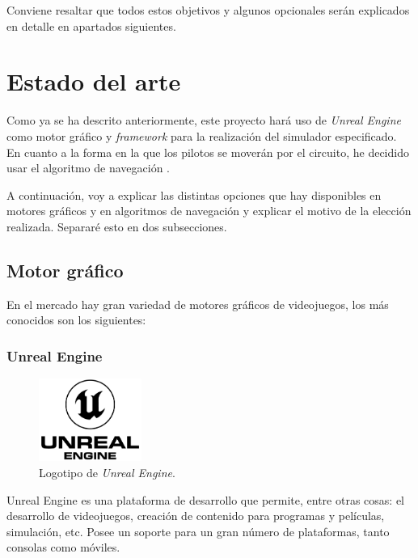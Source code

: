 Conviene resaltar que todos estos objetivos y algunos opcionales serán explicados en detalle en apartados siguientes.

\section{Estado del arte}
Como ya se ha descrito anteriormente, este proyecto hará uso de \textit{Unreal Engine} como motor gráfico y \textit{framework} para la realización del simulador especificado. En cuanto a la forma en la que los pilotos se moverán por el circuito, he decidido usar el algoritmo de navegación \finalAlg.

\bigskip

A continuación, voy a explicar las distintas opciones que hay disponibles en motores gráficos y en algoritmos de navegación y explicar el motivo de la elección realizada. Separaré esto en dos subsecciones.

\subsection{Motor gráfico}
En el mercado hay gran variedad de motores gráficos de videojuegos, los más conocidos son los siguientes:

\subsubsection{Unreal Engine}

\begin{figure}[H]
   \centering
   \includegraphics[width=0.3\textwidth]{imagenes/UE_LOGO.png}
   \caption{Logotipo de \textit{Unreal Engine}\cite{unreal-logo}.}
\end{figure}

Unreal Engine \cite{unreal} es una plataforma de desarrollo que permite, entre otras cosas: el desarrollo de videojuegos, creación de contenido para programas y películas, simulación, etc. Posee un soporte para un gran número de plataformas, tanto consolas como móviles.

